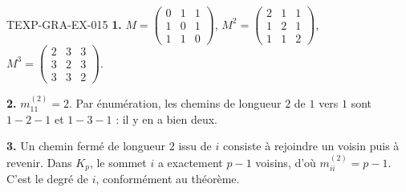 \begin{corrige}{TEXP-GRA-EX-015}
\textbf{1.} $M=\begin{pmatrix}0&1&1\\1&0&1\\1&1&0\end{pmatrix}$,
$M^2=\begin{pmatrix}2&1&1\\1&2&1\\1&1&2\end{pmatrix}$,
$M^3=\begin{pmatrix}2&3&3\\3&2&3\\3&3&2\end{pmatrix}$.

\textbf{2.} $m^{(2)}_{11}=2$. Par énumération, les chemins de longueur $2$ de
$1$ vers $1$ sont $1-2-1$ et $1-3-1$ : il y en a bien deux.

\textbf{3.} Un chemin fermé de longueur $2$ issu de $i$ consiste à rejoindre un
voisin puis à revenir. Dans $K_p$, le sommet $i$ a exactement $p-1$ voisins,
d'où $m^{(2)}_{ii}=p-1$. C'est le degré de $i$, conformément au théorème.
\end{corrige}
